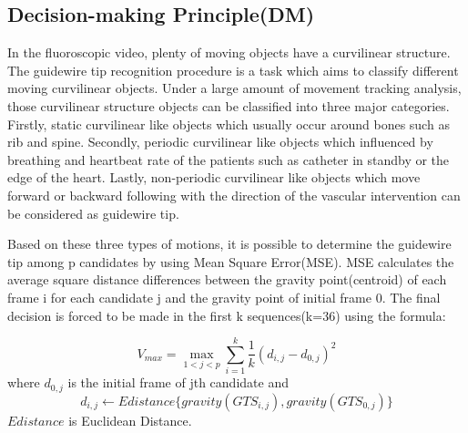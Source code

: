 \documentclass[letterpaper, 10 pt, conference]{ieeeconf}  %
\begin{document}
\subsection{Decision-making Principle(DM)}
In the fluoroscopic video, plenty of moving objects have a curvilinear structure. The guidewire tip recognition procedure is a task which aims to classify different moving curvilinear objects. Under a large amount of movement tracking analysis, those curvilinear structure objects can be classified into three major categories. Firstly, static curvilinear like objects which usually occur around bones such as rib and spine. Secondly, periodic curvilinear like objects which influenced by breathing and heartbeat rate of the patients such as catheter in standby or the edge of the heart. Lastly, non-periodic curvilinear like objects which move forward or backward following with the direction of the vascular intervention can be considered as guidewire tip. 

Based on these three types of motions, it is possible to determine the guidewire tip among p candidates by using Mean Square Error(MSE). MSE calculates the average square distance differences between the gravity point(centroid) of each frame i for each candidate j and the gravity point of initial frame 0. The final decision is forced to be made in the first k sequences(k=36) using the formula: 

$$ V_{max} = \max\limits_{1<j<p} {\sum_{i=1} ^k \frac{1}{k} (d_{i,j}-d_{0,j})^2} $$
where $d_{0,j}$ is the initial frame of jth candidate and 
$$ d_{i,j} \leftarrow Edistance\Big\{gravity(GTS_{i,j}),gravity(GTS_{0,j}) \Big\}$$
$Edistance$ is Euclidean Distance.
\end{document}
